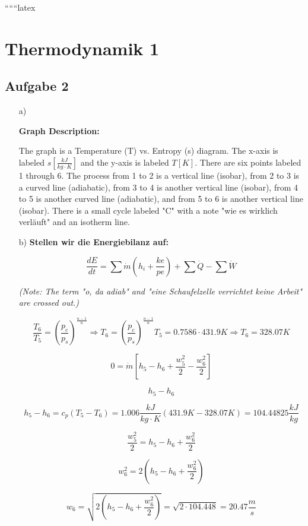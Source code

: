 
``````latex


\section*{Thermodynamik 1}

\subsection*{Aufgabe 2}

\begin{itemize}
    \item[a)] 
    \begin{center}
        \textbf{Graph Description:}
        
        The graph is a Temperature (T) vs. Entropy (s) diagram. The x-axis is labeled \( s \left[ \frac{kJ}{kg \cdot K} \right] \) and the y-axis is labeled \( T \left[ K \right] \). There are six points labeled 1 through 6. The process from 1 to 2 is a vertical line (isobar), from 2 to 3 is a curved line (adiabatic), from 3 to 4 is another vertical line (isobar), from 4 to 5 is another curved line (adiabatic), and from 5 to 6 is another vertical line (isobar). There is a small cycle labeled "C" with a note "wie es wirklich verläuft" and an isotherm line.
    \end{center}
    
    \item[b)] 
    \textbf{Stellen wir die Energiebilanz auf:}
    
    \[
    \frac{dE}{dt} = \sum \dot{m} \left( h_i + \frac{ke}{pe} \right) + \sum \dot{Q} - \sum \dot{W}
    \]
    
    \textit{(Note: The term "o, da adiab" and "eine Schaufelzelle verrichtet keine Arbeit" are crossed out.)}
    
    \[
    \frac{T_6}{T_5} = \left( \frac{p_c}{p_s} \right)^{\frac{n-1}{n}} \Rightarrow T_6 = \left( \frac{p_c}{p_s} \right)^{\frac{n-1}{n}} T_5 = 0.7586 \cdot 431.9K \Rightarrow T_6 = 328.07K
    \]
    
    \[
    0 = \dot{m} \left[ h_5 - h_6 + \frac{w_5^2}{2} - \frac{w_6^2}{2} \right]
    \]
    
    \[
    h_5 - h_6
    \]
    
    \[
    h_5 - h_6 = c_p (T_5 - T_6) = 1.006 \frac{kJ}{kg \cdot K} (431.9K - 328.07K) = 104.44825 \frac{kJ}{kg}
    \]
    
    \[
    \frac{w_5^2}{2} = h_5 - h_6 + \frac{w_6^2}{2}
    \]
    
    \[
    w_6^2 = 2 \left( h_5 - h_6 + \frac{w_6^2}{2} \right)
    \]
    
    \[
    w_6 = \sqrt{2 \left( h_5 - h_6 + \frac{w_6^2}{2} \right)} = \sqrt{2 \cdot 104.448} = 20.47 \frac{m}{s}
    \]
    
\end{itemize}

